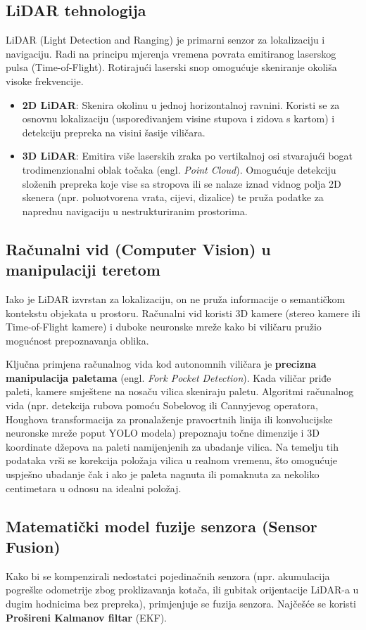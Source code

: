 \documentclass[12pt,a4paper]{article}
\begin{document}
\subsection{LiDAR tehnologija}
LiDAR (Light Detection and Ranging) je primarni senzor za lokalizaciju i navigaciju. Radi na principu mjerenja vremena povrata emitiranog laserskog pulsa (Time-of-Flight). Rotirajući laserski snop omogućuje skeniranje okoliša visoke frekvencije. 
\begin{itemize}
    \item \textbf{2D LiDAR}: Skenira okolinu u jednoj horizontalnoj ravnini. Koristi se za osnovnu lokalizaciju (uspoređivanjem visine stupova i zidova s kartom) i detekciju prepreka na visini šasije viličara.
    \item \textbf{3D LiDAR}: Emitira više laserskih zraka po vertikalnoj osi stvarajući bogat trodimenzionalni oblak točaka (engl. \textit{Point Cloud}). Omogućuje detekciju složenih prepreka koje vise sa stropova ili se nalaze iznad vidnog polja 2D skenera (npr. poluotvorena vrata, cijevi, dizalice) te pruža podatke za naprednu navigaciju u nestrukturiranim prostorima.
\end{itemize}

\subsection{Računalni vid (Computer Vision) u manipulaciji teretom}
Iako je LiDAR izvrstan za lokalizaciju, on ne pruža informacije o semantičkom kontekstu objekata u prostoru. Računalni vid koristi 3D kamere (stereo kamere ili Time-of-Flight kamere) i duboke neuronske mreže kako bi viličaru pružio mogućnost prepoznavanja oblika. 

Ključna primjena računalnog vida kod autonomnih viličara je \textbf{precizna manipulacija paletama} (engl. \textit{Fork Pocket Detection}). Kada viličar priđe paleti, kamere smještene na nosaču vilica skeniraju paletu. Algoritmi računalnog vida (npr. detekcija rubova pomoću Sobelovog ili Cannyjevog operatora, Houghova transformacija za pronalaženje pravocrtnih linija ili konvolucijske neuronske mreže poput YOLO modela) prepoznaju točne dimenzije i 3D koordinate džepova na paleti namijenjenih za ubadanje vilica. Na temelju tih podataka vrši se korekcija položaja vilica u realnom vremenu, što omogućuje uspješno ubadanje čak i ako je paleta nagnuta ili pomaknuta za nekoliko centimetara u odnosu na idealni položaj.

\subsection{Matematički model fuzije senzora (Sensor Fusion)}
Kako bi se kompenzirali nedostatci pojedinačnih senzora (npr. akumulacija pogreške odometrije zbog proklizavanja kotača, ili gubitak orijentacije LiDAR-a u dugim hodnicima bez prepreka), primjenjuje se fuzija senzora. Najčešće se koristi \textbf{Prošireni Kalmanov filtar} (EKF).
\end{document}

